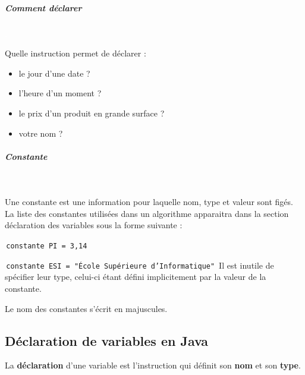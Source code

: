 \documentclass[11pt,a4paper]{article}
\begin{document}
            \par
        
			
		\subparagraph{Comment d\'eclarer} 
		
                \textcolor{white}{.} \par
            
							  Quelle instruction permet de d\'eclarer :
							
					\begin{itemize}
				
			\item le jour d'une date ? \textcolor{gray}{\underline{\hspace*{10em}}} 
			\item l'heure d'un moment ?  \textcolor{gray}{\underline{\hspace*{10em}}} 
			\item le prix d'un produit en grande surface ? \textcolor{gray}{\underline{\hspace*{10em}}} 
			\item votre nom ?  \textcolor{gray}{\underline{\hspace*{10em}}} 
					\end{itemize}
				
			
		\subparagraph{Constante} 
		
					\textcolor{white}{.} \par
				
				  Une constante est une information pour laquelle nom, type et valeur sont fig\'es.
          La liste des constantes utilis\'ees dans un algorithme apparaitra dans la section d\'eclaration des variables sous la forme suivante : 
        
            \par
        \,\verb|constante PI = 3,14|\,
            \par
        \,\verb|constante ESI = "École Supérieure d’Informatique"|\,
          Il est inutile de sp\'ecifier leur type, celui-ci \'etant d\'efini implicitement par la valeur de la constante.
        
            \par
        
          Le nom des constantes s'\'ecrit en majuscules.
        
            \par
        \subsection{D\'eclaration de variables en Java}
          La \textbf{d\'eclaration} d'une variable est l'instruction qui d\'efinit son \textbf{nom} 
          et son \textbf{type}.
        
\end{document}
